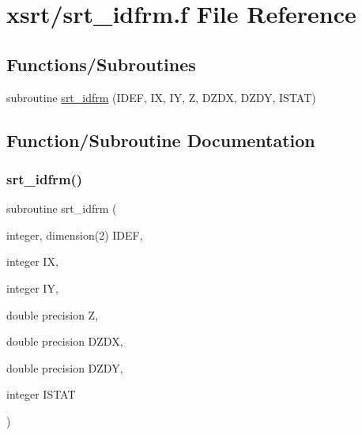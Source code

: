 \hypertarget{srt__idfrm_8f}{}\section{xsrt/srt\+\_\+idfrm.f File Reference}
\label{srt__idfrm_8f}
\subsection*{Functions/\+Subroutines}
\begin{DoxyCompactItemize}
\item 
subroutine \hyperlink{srt__idfrm_8f_a72602a337cced835d6a6ddad6b754c6d}{srt\+\_\+idfrm} (I\+D\+EF, IX, IY, Z, D\+Z\+DX, D\+Z\+DY, I\+S\+T\+AT)
\end{DoxyCompactItemize}


\subsection{Function/\+Subroutine Documentation}
\mbox{\label{srt__idfrm_8f_a72602a337cced835d6a6ddad6b754c6d}} 
\subsubsection{\texorpdfstring{srt\+\_\+idfrm()}{srt\_idfrm()}}
{\footnotesize\ttfamily subroutine srt\+\_\+idfrm (\begin{DoxyParamCaption}\item[{integer, dimension(2)}]{I\+D\+EF,  }\item[{integer}]{IX,  }\item[{integer}]{IY,  }\item[{double precision}]{Z,  }\item[{double precision}]{D\+Z\+DX,  }\item[{double precision}]{D\+Z\+DY,  }\item[{integer}]{I\+S\+T\+AT }\end{DoxyParamCaption})}

